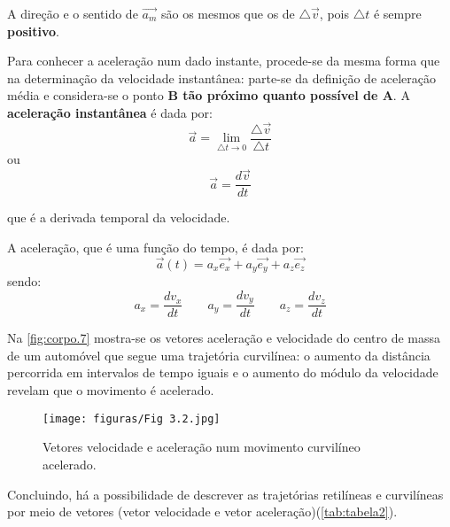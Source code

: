 \documentclass[a4paper,11pt,oneside]{report}
\begin{document}
A direção e o sentido de $\overrightarrow{a_m}$ são os mesmos que os de $\bigtriangleup\overrightarrow{v} $, pois $\bigtriangleup t$ é sempre \textbf{positivo}.

Para conhecer a aceleração num dado instante, procede-se da mesma forma que na determinação da velocidade instantânea: 
parte-se da definição de aceleração média e considera-se o ponto \textbf{B tão próximo quanto possível de A}. A \textbf{aceleração instantânea} 
é dada por:
\[
    \overrightarrow{a}=\lim_{\bigtriangleup t\to 0} \frac{\bigtriangleup\overrightarrow{v}}{\bigtriangleup t}    
\]
ou 
\[
    \overrightarrow{a}=\frac{d \overrightarrow{v}}{d t}  
\]

que é a derivada temporal da velocidade. 

A aceleração, que é uma função do tempo, é dada por:
\[
    \overrightarrow{a}(t)=a_x\overrightarrow{e_x}+a_y\overrightarrow{e_y}+a_z\overrightarrow{e_z}    
\]
sendo:
\[
    a_x=\frac{d v_x}{d t} \qquad a_y=\frac{d v_y}{d t} \qquad a_z=\frac{d v_z}{d t}  
\]

Na \autoref{fig:corpo.7} mostra-se os vetores aceleração e velocidade do centro de massa de um automóvel que segue uma trajetória curvilínea: 
o aumento da distância percorrida em intervalos de tempo iguais e o aumento do módulo da velocidade revelam que o movimento 
é acelerado.

\begin{figure}[H]
    \center
    \texttt{[image: figuras/Fig 3.2.jpg]}
    \caption{Vetores velocidade e aceleração num movimento curvilíneo acelerado.}
    \label{fig:corpo.7}
\end{figure}

Concluindo, há a possibilidade de descrever as trajetórias retilíneas e curvilíneas por meio de vetores (vetor velocidade 
e vetor aceleração)(\autoref{tab:tabela2}). 
\end{document}
